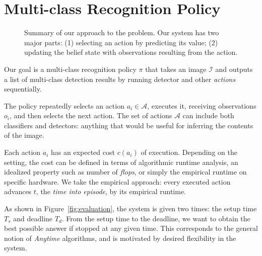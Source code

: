 \section{Multi-class Recognition Policy} \label{sec:tech}
\begin{figure}[h!]
  \caption{Summary of our approach to the problem. Our system has two major parts: (1) selecting an action by predicting its value; (2) updating the belief state with observations resulting from the action.}
  \label{fig:pomdp}
\end{figure}

Our goal is a multi-class recognition policy $\pi$ that takes an image $\mathcal{I}$ and outputs a list of multi-class detection results by running detector and other \emph{actions} sequentially.

The policy repeatedly selects an action $a_i \in \mathcal{A}$, executes it, receiving observations $o_i$, and then selects the next action.
The set of actions $\mathcal{A}$ can include both classifiers and detectors: anything that would be useful for inferring the contents of the image.

Each action $a_i$ has an expected cost $c(a_i)$ of execution.
Depending on the setting, the cost can be defined in terms of algorithmic runtime analysis, an idealized property such as number of \emph{flops}, or simply the empirical runtime on specific hardware.
We take the empirical approach: every executed action advances $t$, the \emph{time into episode}, by its empirical runtime.

As shown in Figure~\ref{fig:evaluation}, the system is given two times: the setup time $T_s$ and deadline $T_d$.
From the setup time to the deadline, we want to obtain the best possible answer if stopped at any given time.
This corresponds to the general notion of \emph{Anytime} algorithms, and is motivated by desired flexibility in the system.


